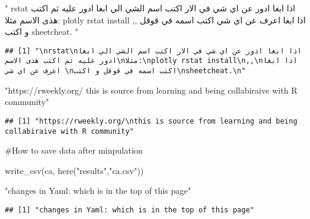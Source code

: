 \documentclass[
]{article}
\newenvironment{Shaded}{\begin{snugshade}}{\end{snugshade}}
\newcommand{\FunctionTok}[1]{\textcolor[rgb]{0.00,0.00,0.00}{#1}}
\newcommand{\NormalTok}[1]{#1}
\newcommand{\StringTok}[1]{\textcolor[rgb]{0.31,0.60,0.02}{#1}}
\begin{document}
\begin{Shaded}
\begin{Highlighting}[]
\StringTok{"}
\StringTok{rstat}
\StringTok{اذا ابغا ادور عن اي شي في الار اكتب اسم الشي الي ابغا ادور عليه ثم اكتب هذى الاسم}
\StringTok{مثلا:}
\StringTok{plotly rstat install}
\StringTok{,,}
\StringTok{اذا ابغا اعرف عن اي شي }
\StringTok{اكتب اسمه في قوقل و اكتب}
\StringTok{sheetcheat.}
\StringTok{"}
\end{Highlighting}
\end{Shaded}

\begin{verbatim}
## [1] "\nrstat\nاذا ابغا ادور عن اي شي في الار اكتب اسم الشي الي ابغا ادور عليه ثم اكتب هذى الاسم\nمثلا:\nplotly rstat install\n,,\nاذا ابغا اعرف عن اي شي \nاكتب اسمه في قوقل و اكتب\nsheetcheat.\n"
\end{verbatim}

\begin{Shaded}
\begin{Highlighting}[]
\StringTok{"https://rweekly.org/}
\StringTok{this is source from learning and being collabiraive with R community"}
\end{Highlighting}
\end{Shaded}

\begin{verbatim}
## [1] "https://rweekly.org/\nthis is source from learning and being collabiraive with R community"
\end{verbatim}

\#How to save data after minpulation

\begin{Shaded}
\begin{Highlighting}[]
\FunctionTok{write\_csv}\NormalTok{(ca, }\FunctionTok{here}\NormalTok{(}\StringTok{"results"}\NormalTok{,}\StringTok{"ca.csv"}\NormalTok{))}
\end{Highlighting}
\end{Shaded}

\begin{Shaded}
\begin{Highlighting}[]
\StringTok{"changes in Yaml: which is in the top of this page"}
\end{Highlighting}
\end{Shaded}

\begin{verbatim}
## [1] "changes in Yaml: which is in the top of this page"
\end{verbatim}
\end{document}
